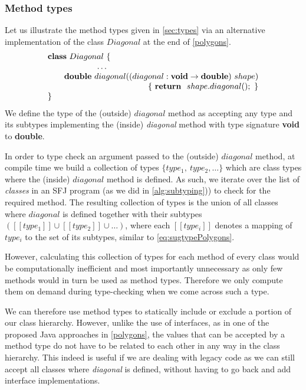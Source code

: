 \documentclass[runningheads]{llncs}
\begin{document}
\subsubsection{Method types}
Let us illustrate the method types given in \autoref{sec:types} via an alternative implementation of the class $Diagonal$ at the end of \autoref{polygons}.
$$
\begin{array}{l}
    \synclass Diagonal \ \{
    \\
    \qquad\qquad\qquad \ldots \\
    \qquad \textbf{double}\ diagonal((diagonal: \textbf{void} \rightarrow \textbf{double})\ shape)\\
    \hfill
    \{\ \synret\ shape.diagonal();\ \}
    \\
    \}
\end{array}
$$
We define the type of the (outside) $diagonal$ method as accepting any type and its subtypes implementing the (inside) \emph{diagonal} method with type signature \textbf{void} to \textbf{double}.

In order to type check an argument passed to the (outside) $diagonal$ method, at compile time we build a collection of types $\{type_{1},\ type_{2},\ldots\}$ which are class types where the (inside) $diagonal$ method is defined.
As such, we iterate over the list of \emph{classes} in an SFJ program (as we did in \autoref{alg:subtyping})) to check for the required method.
The resulting collection of types is the union of all classes where $diagonal$ is defined together with their subtypes $([\![type_{1}]\!] \cup [\![type_{2}]\!] \cup \ldots)$, where each $[\![type_{i}]\!]$ denotes a mapping of $type_i$ to the set of its subtypes, similar to \autoref{eq:sugtypePolygons}.

However, calculating this collection of types for each method of every class would be computationally inefficient and most importantly unnecessary as only few methods would in turn be used as method types.
Therefore we only compute them on demand during type-checking when we come across such a type.

We can therefore use method types to statically include or exclude a portion of our class hierarchy.
However, unlike the use of interfaces, as in one of the proposed Java approaches in \autoref{polygons}, the values that can be accepted by a method type do not have to be related to each other in any way in the class hierarchy.
This indeed is useful if we are dealing with legacy code as we can still accept all classes where \emph{diagonal} is defined, without having to go back and add interface implementations.
\end{document}
